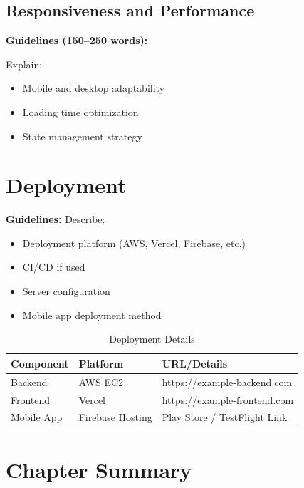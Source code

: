 \subsection{Responsiveness and Performance}

\textbf{Guidelines (150–250 words):}

Explain:
\begin{itemize}
    \item Mobile and desktop adaptability
    \item Loading time optimization
    \item State management strategy
\end{itemize}


\section{Deployment}

\textbf{Guidelines:}
Describe:
\begin{itemize}
    \item Deployment platform (AWS, Vercel, Firebase, etc.)
    \item CI/CD if used
    \item Server configuration
    \item Mobile app deployment method
\end{itemize}

\begin{table}[h]
\centering
\caption{Deployment Details}
\begin{tabularx}{\textwidth}{|p{3cm}|p{3cm}|X|}
\hline
\textbf{Component} & \textbf{Platform} & \textbf{URL/Details} \\
\hline
Backend & AWS EC2 & https://example-backend.com \\
\hline
Frontend & Vercel & https://example-frontend.com \\
\hline
Mobile App & Firebase Hosting & Play Store / TestFlight Link \\
\hline
\end{tabularx}
\end{table}


\section{Chapter Summary}

